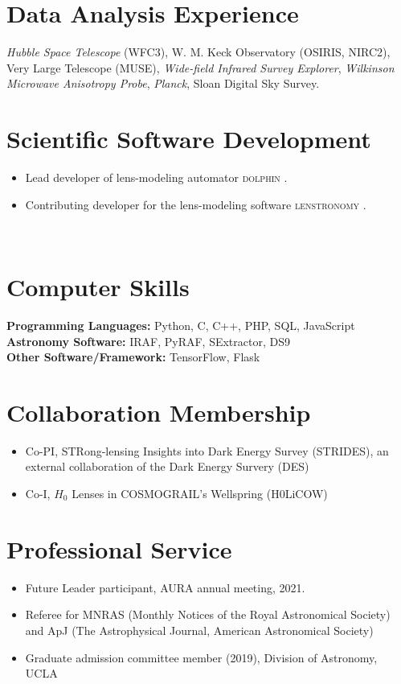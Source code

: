 \documentclass[margin, line]{res}
\newenvironment{list2}{
  \begin{list}{$\bullet$}{%
      \setlength{\itemsep}{0in}
      \setlength{\parsep}{0in} \setlength{\parskip}{0in}
      \setlength{\topsep}{0in} \setlength{\partopsep}{0in} 
      \setlength{\leftmargin}{0.2in}}}{\end{list}}
\begin{document}
\begin{resume}
\section{\sc Data Analysis Experience}
\textit{Hubble Space Telescope} (WFC3), 
W. M. Keck Observatory (OSIRIS, NIRC2),
Very Large Telescope (MUSE),
{\it Wide-field Infrared Survey Explorer},
{\it Wilkinson Microwave Anisotropy Probe},
{\it Planck},
Sloan Digital Sky Survey.

\section{\sc Scientific Software Development} 
\begin{itemize}
	\item Lead developer of lens-modeling automator \textsc{dolphin} \href{https://github.com/ajshajib/dolphin}{\faGithub}.
	\item Contributing developer for the lens-modeling software \textsc{lenstronomy} \href{https://github.com/sibirrer/lenstronomy}{\faGithub}.
\end{itemize}
\\

\section{\sc Computer Skills} 
\textbf{Programming Languages:} Python, C, C++, PHP, SQL, JavaScript \\
\textbf{Astronomy Software:} IRAF, PyRAF, SExtractor, DS9 \\
\textbf{Other Software/Framework:} TensorFlow, Flask


\section{\sc Collaboration Membership}
\begin{itemize}
	\item Co-PI, STRong-lensing Insights into Dark Energy Survey (STRIDES), an external collaboration of the Dark Energy Survery (DES)
	\item Co-I, $H_0$ Lenses in COSMOGRAIL's Wellspring (H0LiCOW)
\end{itemize}

\section{\sc Professional Service}
\begin{itemize}
\item Future Leader participant, AURA annual meeting, 2021.
\item Referee for MNRAS (Monthly Notices of the Royal Astronomical Society) and ApJ (The Astrophysical Journal, American Astronomical Society)
\item Graduate admission committee member (2019), Division of Astronomy, UCLA
\end{itemize}


\end{resume}
\end{document}
